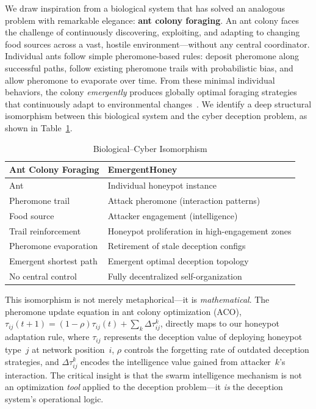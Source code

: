 \documentclass[review,3p,twocolumn]{elsarticle}
\begin{document}
We draw inspiration from a biological system that has solved an analogous problem with remarkable elegance: \textbf{ant colony foraging}. An ant colony faces the challenge of continuously discovering, exploiting, and adapting to changing food sources across a vast, hostile environment---without any central coordinator. Individual ants follow simple pheromone-based rules: deposit pheromone along successful paths, follow existing pheromone trails with probabilistic bias, and allow pheromone to evaporate over time. From these minimal individual behaviors, the colony \emph{emergently} produces globally optimal foraging strategies that continuously adapt to environmental changes~\cite{dorigo2004ant}. We identify a deep structural isomorphism between this biological system and the cyber deception problem, as shown in Table~\ref{tab:isomorphism}.

\begin{table}[t]
\centering
\caption{Biological--Cyber Isomorphism}
\label{tab:isomorphism}
\small
\begin{tabular}{@{}ll@{}}
\toprule
\textbf{Ant Colony Foraging} & \textbf{EmergentHoney} \\
\midrule
Ant & Individual honeypot instance \\
Pheromone trail & Attack pheromone (interaction patterns) \\
Food source & Attacker engagement (intelligence) \\
Trail reinforcement & Honeypot proliferation in high-engagement zones \\
Pheromone evaporation & Retirement of stale deception configs \\
Emergent shortest path & Emergent optimal deception topology \\
No central control & Fully decentralized self-organization \\
\bottomrule
\end{tabular}
\end{table}

This isomorphism is not merely metaphorical---it is \emph{mathematical}. The pheromone update equation in ant colony optimization (ACO), $\tau_{ij}(t{+}1) = (1{-}\rho)\tau_{ij}(t) + \sum_k \Delta\tau_{ij}^k$, directly maps to our honeypot adaptation rule, where $\tau_{ij}$ represents the deception value of deploying honeypot type~$j$ at network position~$i$, $\rho$ controls the forgetting rate of outdated deception strategies, and $\Delta\tau_{ij}^k$ encodes the intelligence value gained from attacker~$k$'s interaction. The critical insight is that the swarm intelligence mechanism is not an optimization \emph{tool} applied to the deception problem---it \emph{is} the deception system's operational logic.
\end{document}
